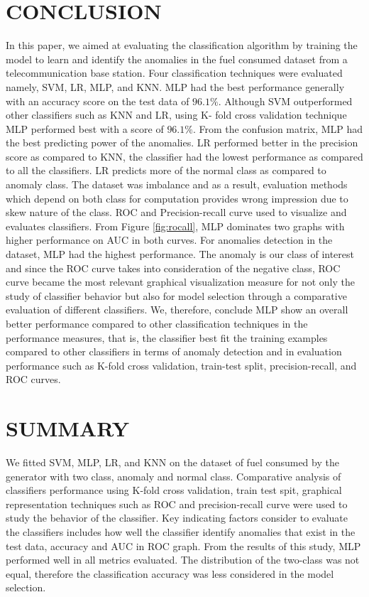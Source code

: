 \documentclass[a4paper,fleqn]{cas-dc}
\begin{document}
\section{CONCLUSION}

In this paper, we aimed at evaluating the classification algorithm by training the model to learn and identify the anomalies in the fuel consumed dataset from a telecommunication base station. Four classification techniques were evaluated namely, SVM, LR, MLP, and KNN. MLP had the best performance generally with an accuracy score on the test data of $96.1\%$. Although SVM outperformed other classifiers such as KNN and LR, using K- fold cross validation technique MLP performed best with a score of $96.1\%$. From the confusion matrix, MLP had the best predicting power of the anomalies. LR performed better in the precision score as compared to KNN, the classifier had the lowest performance as compared to all the classifiers. LR predicts more of the normal class as compared to anomaly class. The dataset was imbalance and as a result, evaluation methods which depend on both class for computation provides wrong impression due to skew nature of the class.  ROC and Precision-recall curve used to visualize and evaluates classifiers. From Figure \ref{fig:rocall}, MLP dominates two graphs with higher performance on AUC in both curves. 
For anomalies detection in the dataset, MLP had the highest performance. The anomaly is our class of interest and since the ROC curve takes into consideration of the negative class, ROC curve became the most relevant graphical visualization measure for not only the study of classifier behavior but also for model selection through a comparative evaluation of different classifiers. We, therefore, conclude MLP show an overall better performance compared to other classification techniques in the performance measures, that is, the classifier best fit the training examples compared to other classifiers in terms of anomaly detection and in evaluation performance such as K-fold cross validation, train-test split, precision-recall, and ROC curves.  




\section{SUMMARY}
We fitted SVM, MLP, LR, and KNN on the dataset of fuel consumed by the generator with two class, anomaly and normal class. Comparative analysis of classifiers performance using K-fold cross validation, train test spit, graphical representation techniques such as ROC and precision-recall curve were used to study the behavior of the classifier. Key indicating factors consider to evaluate the classifiers includes how well the classifier identify anomalies that exist in the test data, accuracy and AUC in ROC graph. From the results of this study, MLP performed well in all metrics evaluated. The distribution of the two-class was not equal, therefore the classification accuracy was less considered in the model selection. 
\end{document}
